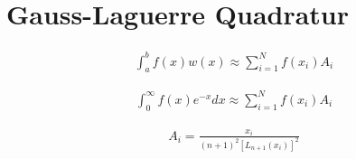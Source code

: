 %
%
%
\section{Gauss-Laguerre Quadratur
\label{laguerre:section:quadratur}}

\begin{align}
    \int_a^b f(x) w(x)
    \approx
    \sum_{i=1}^N f(x_i) A_i
    \label{laguerre:gaussquadratur}
\end{align}

\begin{align}
    \int_{0}^{\infty} f(x) e^{-x} dx 
    \approx
    \sum_{i=1}^{N} f(x_i) A_i
    \label{laguerre:laguerrequadratur}
\end{align}

\begin{align}
    A_i 
    = 
    \frac{x_i}{(n + 1)^2 \left[ L_{n + 1}(x_i)\right]^2}
    \label{laguerre:quadratur_gewichte}
\end{align}

